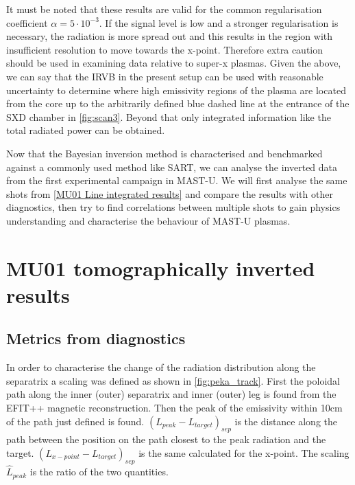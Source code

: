 It must be noted that these results are valid for the common regularisation coefficient $\alpha=5 \cdot 10^{-3}$. If the signal level is low and a stronger regularisation is necessary, the radiation is more spread out and this results in the region with insufficient resolution to move towards the x-point. Therefore extra caution should be used in examining data relative to super-x plasmas.
Given the above, we can say that the IRVB in the present setup can be used with reasonable uncertainty to determine where high emissivity regions of the plasma are located from the core up to the arbitrarily defined blue dashed line at the entrance of the SXD chamber in \autoref{fig:scan3}. Beyond that only integrated information like the total radiated power can be obtained.


Now that the Bayesian inversion method is characterised and benchmarked against a commonly used method like SART, we can analyse the inverted data from the first experimental campaign in MAST-U. We will first analyse the same shots from \autoref{MU01 Line integrated results} and compare the results with other diagnostics, then try to find correlations between multiple shots to gain physics understanding and characterise the behaviour of MAST-U plasmas.

\section{MU01 tomographically inverted results}\label{MU01 tomographycally inverted results}

\subsection{Metrics from diagnostics}\label{Metrics from diagnostics}
In order to characterise the change of the radiation distribution along the separatrix a scaling was defined as shown in \autoref{fig:peka_track}. First the poloidal path along the inner (outer) separatrix and inner (outer) leg is found from the EFIT++ magnetic reconstruction. Then the peak of the emissivity within 10cm of the path just defined is found. $(L_{peak}-L_{target})_{sep}$ is the distance along the path between the position on the path closest to the peak radiation and the target. $(L_{x-point}-L_{target})_{sep}$ is the same calculated for the x-point. The scaling $\hat{L}_{peak}$ is the ratio of the two quantities.

